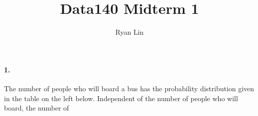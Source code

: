 \documentclass{report}
\title{Data140 Midterm 1}
\author{Ryan Lin}
\date{}
\begin{document}
\paragraph{1. } The number of people who will board a bus has the probability distribution given in the table on the left below. Independent of the number of people who will board, the number of 
\end{document}
